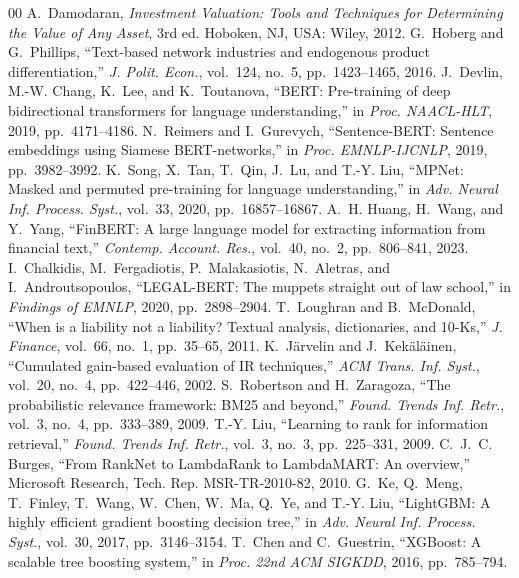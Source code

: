 \documentclass[conference]{IEEEtran}
\begin{document}
\begin{thebibliography}{00}
\footnotesize
{} A.~Damodaran, \emph{Investment Valuation: Tools and Techniques for Determining the Value of Any Asset}, 3rd ed. Hoboken, NJ, USA: Wiley, 2012.
 G.~Hoberg and G.~Phillips, ``Text-based network industries and endogenous product differentiation,'' \emph{J. Polit. Econ.}, vol.~124, no.~5, pp.~1423--1465, 2016.
 J.~Devlin, M.-W. Chang, K.~Lee, and K.~Toutanova, ``BERT: Pre-training of deep bidirectional transformers for language understanding,'' in \emph{Proc. NAACL-HLT}, 2019, pp.~4171--4186.
 N.~Reimers and I.~Gurevych, ``Sentence-BERT: Sentence embeddings using Siamese BERT-networks,'' in \emph{Proc. EMNLP-IJCNLP}, 2019, pp.~3982--3992.
 K.~Song, X.~Tan, T.~Qin, J.~Lu, and T.-Y. Liu, ``MPNet: Masked and permuted pre-training for language understanding,'' in \emph{Adv. Neural Inf. Process. Syst.}, vol.~33, 2020, pp.~16857--16867.
 A.~H. Huang, H.~Wang, and Y.~Yang, ``FinBERT: A large language model for extracting information from financial text,'' \emph{Contemp. Account. Res.}, vol.~40, no.~2, pp.~806--841, 2023.
 I.~Chalkidis, M.~Fergadiotis, P.~Malakasiotis, N.~Aletras, and I.~Androutsopoulos, ``LEGAL-BERT: The muppets straight out of law school,'' in \emph{Findings of EMNLP}, 2020, pp.~2898--2904.
 T.~Loughran and B.~McDonald, ``When is a liability not a liability? Textual analysis, dictionaries, and 10-Ks,'' \emph{J. Finance}, vol.~66, no.~1, pp.~35--65, 2011.
 K.~J\"arvelin and J.~Kek\"al\"ainen, ``Cumulated gain-based evaluation of IR techniques,'' \emph{ACM Trans. Inf. Syst.}, vol.~20, no.~4, pp.~422--446, 2002.
 S.~Robertson and H.~Zaragoza, ``The probabilistic relevance framework: BM25 and beyond,'' \emph{Found. Trends Inf. Retr.}, vol.~3, no.~4, pp.~333--389, 2009.
 T.-Y. Liu, ``Learning to rank for information retrieval,'' \emph{Found. Trends Inf. Retr.}, vol.~3, no.~3, pp.~225--331, 2009.
 C.~J.~C. Burges, ``From RankNet to LambdaRank to LambdaMART: An overview,'' Microsoft Research, Tech. Rep. MSR-TR-2010-82, 2010.
 G.~Ke, Q.~Meng, T.~Finley, T.~Wang, W.~Chen, W.~Ma, Q.~Ye, and T.-Y. Liu, ``LightGBM: A highly efficient gradient boosting decision tree,'' in \emph{Adv. Neural Inf. Process. Syst.}, vol.~30, 2017, pp.~3146--3154.
 T.~Chen and C.~Guestrin, ``XGBoost: A scalable tree boosting system,'' in \emph{Proc. 22nd ACM SIGKDD}, 2016, pp.~785--794.

\end{thebibliography}
\end{document}
